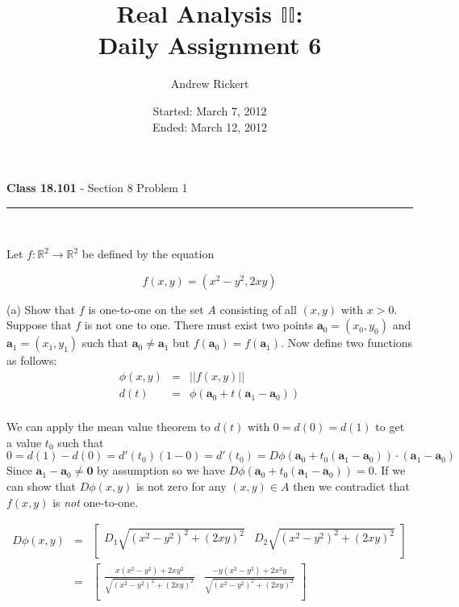 \documentclass[11pt,reqno]{article}
\title{Real Analysis $\mathbb{II}$: \\ Daily Assignment 6}
\author{Andrew Rickert}
\date{Started: March 7, 2012 \\ \hspace{1pt} Ended: March 12,  2012}                                           %
\begin{document}
\maketitle

\begin{flushleft} 
\textbf{Class 18.101} - Section 8 Problem 1\\
\rule{500pt}{1pt}\\
\end{flushleft} 

\noindent Let $f : \mathbb{R}^2 \to \mathbb{R}^2$ be defined by the equation

\[ f(x,y) = (x^2 - y^2, 2 x y) \]

\noindent (a) Show that $f$ is one-to-one on the set $A$ consisting of all $(x,y)$ with $x > 0$. \\

Suppose that $f$ is not one to one. There must exist two points $\textbf{a}_0 = (x_0,y_0)$ and $\textbf{a}_1 = (x_1,y_1)$ such that $\textbf{a}_0 \neq \textbf{a}_1$ but $f(\textbf{a}_0) = f(\textbf{a}_1)$. Now define two functions as follows:
\begin{eqnarray*}
\phi(x,y) &=& ||f(x,y)||\\
d(t) &=& \phi(\textbf{a}_0 + t(\textbf{a}_1 - \textbf{a}_0))\\
\end{eqnarray*}

\noindent We can apply the mean value theorem to $d(t)$ with $0 = d(0) = d(1)$ to get a value $t_0$ such that 
\[ 0 = d(1) - d(0) = d'(t_0)(1 - 0) = d'(t_0) = D \phi(\textbf{a}_0 + t_0(\textbf{a}_1 - \textbf{a}_0)) \cdot (\textbf{a}_1 - \textbf{a}_0) \]
Since $\textbf{a}_1 - \textbf{a}_0 \neq \textbf{0}$ by assumption so we have $D \phi(\textbf{a}_0 + t_0(\textbf{a}_1 - \textbf{a}_0)) = 0$. If we can show that $D \phi(x,y)$ is not zero for any $(x,y) \in A$ then we contradict that $f(x,y)$ is \emph{not} one-to-one.

 \begin{eqnarray*} 
 D \phi(x,y) &=& \left[ \begin{array}{cc} 
 D_1 \sqrt{(x^2 - y^2)^2 + (2 x y)^2} & D_2 \sqrt{(x^2 - y^2)^2 + (2 x y)^2}\\
\end{array} \right] \\
		 &=& \left[ \begin{array}{cc} 
 \frac{x(x^2 - y^2) + 2 x y^2}{\sqrt{(x^2 - y^2)^2 + (2 x y)^2}} & \frac{-y(x^2 - y^2) + 2 x^2 y}{\sqrt{(x^2 - y^2)^2 + (2 x y)^2}}\\
\end{array} \right] \\
\end{eqnarray*}
\end{document}
